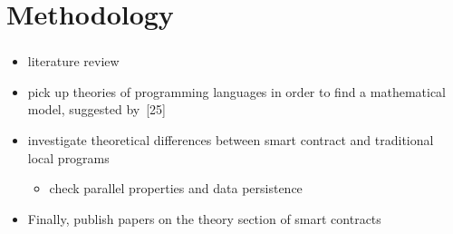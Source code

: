 \documentclass[xcolor=svgnames]{beamer}
\begin{document}
\section{Methodology}
\begin{frame}[t]
\frametitle{}
\begin{itemize}
\item<2-> literature review

\item<3-> pick up theories of programming languages in order to find a mathematical model, suggested by~[25]



\item<5-> investigate theoretical differences between smart contract and traditional local programs
	\begin{itemize}
	\item check parallel properties and data persistence
	\end{itemize}
\item<6-> Finally, publish papers on the theory section of smart contracts
\end{itemize}
\end{frame}
\end{document}
